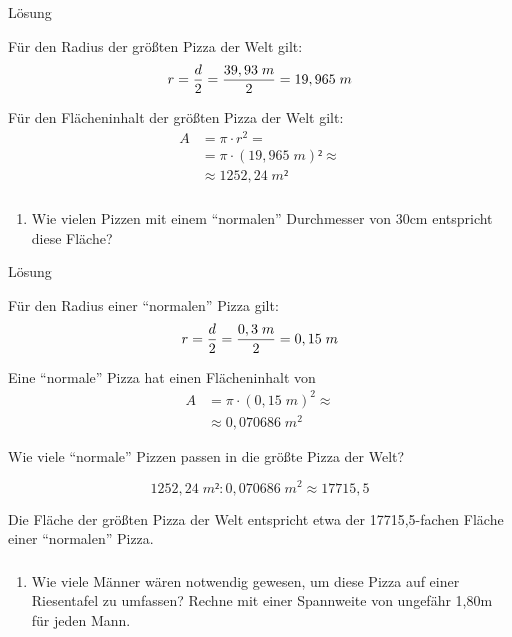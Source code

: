 \documentclass[
  ngerman,
]{book}
\providecommand{\tightlist}{%
  \setlength{\itemsep}{0pt}\setlength{\parskip}{0pt}}
\begin{document}
Lösung

Für den Radius der größten Pizza der Welt gilt:
\[r = {d \over 2} = {39,93\;m \over 2} = 19,965\; m\]

Für den Flächeninhalt der größten Pizza der Welt gilt:
\[ \begin{align} A &=\pi \cdot r^2 =\\
                   &= \pi \cdot (19,965\;m)² \approx \\
                   & \approx 1252,24\;m² \end{align}\]

\hypertarget{section-48}{%
\subsubsection*{}\label{section-48}}

\begin{enumerate}
\def\labelenumi{\alph{enumi})}
\setcounter{enumi}{1}
\tightlist
\item
  Wie vielen Pizzen mit einem ``normalen'' Durchmesser von 30cm entspricht diese Fläche?
\end{enumerate}

Lösung

Für den Radius einer ``normalen'' Pizza gilt:
\[r = {d \over 2} = {0,3\;m \over 2} = 0,15\; m\]

Eine ``normale'' Pizza hat einen Flächeninhalt von
\[ \begin{align} A &= \pi \cdot (0,15\;m)^2 \approx \\
                    & \approx 0,070686\;m ^2 \end{align} \]

Wie viele ``normale'' Pizzen passen in die größte Pizza der Welt?

\[1252,24\;m² : 0,070686\;m ^2 \approx 17715,5\]

Die Fläche der größten Pizza der Welt entspricht etwa der 17715,5-fachen Fläche einer ``normalen'' Pizza.

\hypertarget{section-49}{%
\subsubsection*{}\label{section-49}}

\begin{enumerate}
\def\labelenumi{\alph{enumi})}
\setcounter{enumi}{2}
\tightlist
\item
  Wie viele Männer wären notwendig gewesen, um diese Pizza auf einer Riesentafel zu umfassen? Rechne mit einer Spannweite von ungefähr 1,80m für jeden Mann.
\end{enumerate}
\end{document}
